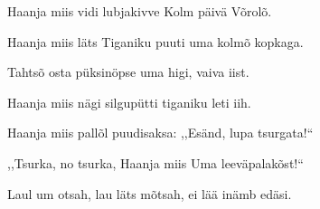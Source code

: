 Haanja miis vidi lubjakivve
Kolm p\"aiv\"a V\~orol\~o.

Haanja miis l\"ats Tiganiku puuti
uma kolm\~o kopkaga.

Tahts\~o osta p\"uksin\"opse
uma higi, vaiva iist.

Haanja miis n\"agi silgup\"utti
tiganiku leti iih.

Haanja miis pall\~ol puudisaksa:
,,Es\"and, lupa tsurgata!{``}

,,Tsurka, no tsurka, Haanja miis
Uma leev\"apalak\~ost!{``}

Laul um otsah, lau l\"ats m\~otsah,
ei l\"a\"a in\"amb ed\"asi.